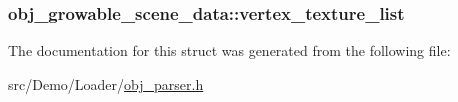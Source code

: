 \hypertarget{structobj__growable__scene__data_a85ee455560d2f8c8910257bb4b96c5bf}{
\subsubsection[{vertex\+\_\+texture\+\_\+list}]{ obj\+\_\+growable\+\_\+scene\+\_\+data\+::vertex\+\_\+texture\+\_\+list}}\label{structobj__growable__scene__data_a85ee455560d2f8c8910257bb4b96c5bf}


The documentation for this struct was generated from the following file\+:\begin{DoxyCompactItemize}
\item 
src/\+Demo/\+Loader/\hyperlink{obj__parser_8h}{obj\+\_\+parser.\+h}\end{DoxyCompactItemize}
